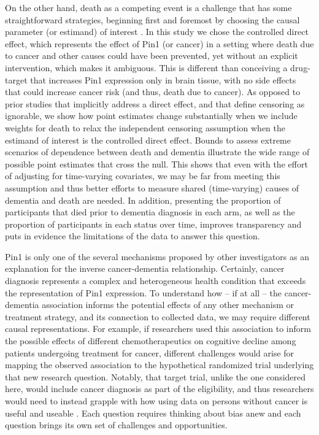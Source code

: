 \documentclass[
]{book}
\begin{document}
On the other hand, death as a competing event is a challenge that has some straightforward strategies, beginning first and foremost by choosing the causal parameter (or estimand) of interest \autocite[\textcite{rojas_medrxiv}]{young2020}. In this study we chose the controlled direct effect, which represents the effect of Pin1 (or cancer) in a setting where death due to cancer and other causes could have been prevented, yet without an explicit intervention, which makes it ambiguous. This is different than conceiving a drug-target that increases Pin1 expression only in brain tissue, with no side effects that could increase cancer risk (and thus, death due to cancer). As opposed to prior studies that implicitly address a direct effect, and that define censoring as ignorable\autocite{frain2017}, we show how point estimates change substantially when we include weights for death to relax the independent censoring assumption \autocite[\textcite{vangeloven2014}, \textcite{willems2018}, \textcite{young2020}]{weave2012} when the estimand of interest is the controlled direct effect. Bounds to assess extreme scenarios of dependence between death and dementia\autocite{peterson1976} illustrate the wide range of possible point estimates that cross the null. This shows that even with the effort of adjusting for time-varying covariates, we may be far from meeting this assumption and thus better efforts to measure shared (time-varying) causes of dementia and death are needed. In addition, presenting the proportion of participants that died prior to dementia diagnosis in each arm, as well as the proportion of participants in each status over time, improves transparency and puts in evidence the limitations of the data to answer this question.

Pin1 is only one of the several mechanisms proposed by other investigators as an explanation for the inverse cancer-dementia relationship. Certainly, cancer diagnosis represents a complex and heterogeneous health condition that exceeds the representation of Pin1 expression. To understand how -- if at all -- the cancer-dementia association informs the potential effects of any other mechanism or treatment strategy, and its connection to collected data, we may require different causal representations. For example, if researchers used this association to inform the possible effects of different chemotherapeutics on cognitive decline among patients undergoing treatment for cancer, different challenges would arise for mapping the observed association to the hypothetical randomized trial underlying that new research question. Notably, that target trial, unlike the one considered here, would include cancer diagnosis as part of the eligibility, and thus researchers would need to instead grapple with how using data on persons without cancer is useful and useable \autocite{huitfeldt2016}.
Each question requires thinking about bias anew and each question brings its own set of challenges and opportunities.
\end{document}

